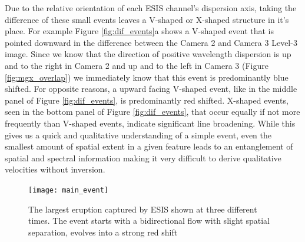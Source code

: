 {    	Due to the relative orientation of each ESIS channel's dispersion axis, taking the difference of these small events leaves a V-shaped or X-shaped structure in it's place.
    	For example Figure \ref{fig:dif_events}a shows a V-shaped event that is pointed downward in the difference between the Camera 2 and Camera 3 Level-3 image.
    	Since we know that the direction of positive wavelength dispersion is up and to the right in Camera 2 and up and to the left in Camera 3 (Figure \ref{fig:mgx_overlap}) we immediately know that this event is predominantly blue shifted.
    	For opposite reasons, a upward facing V-shaped event, like in the middle panel of Figure \ref{fig:dif_events}, is predominantly red shifted.
    	X-shaped events, seen in the bottom panel of Figure \ref{fig:dif_events}, that occur equally if not more frequently than V-shaped events, indicate significant line broadening.
    	While this gives us a quick and qualitative understanding of a simple event, even the smallest amount of spatial extent in a given feature leads to an entanglement of spatial and spectral information making it very difficult to derive qualitative velocities without inversion. 
    	
    	\begin{figure}[htb!]
    		\texttt{[image: main\_event]}
    		\centering
    		\caption{The largest eruption captured by ESIS shown at three different times. The event starts with a bidirectional flow with slight spatial separation, evolves into a strong red shift }
    		\label{fig:main_event}
    	\end{figure}
		
}
